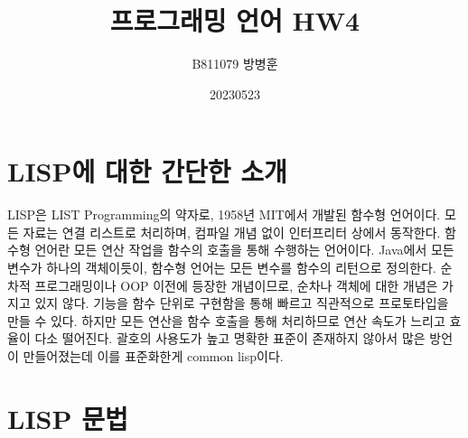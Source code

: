 \documentclass{article}
\title{프로그래밍 언어 HW4}
\author{B811079 방병훈}
\date{20230523}
\begin{document}
\maketitle
\section{LISP에 대한 간단한 소개}
LISP은 LIST Programming의 약자로, 1958년 MIT에서 개발된 함수형 언어이다. 모든 자료는 연결 리스트로 처리하며, 컴파일 개념 없이 인터프리터 상에서 동작한다. 함수형 언어란 모든 연산 작업을 함수의 호출을 통해 수행하는 언어이다. Java에서 모든 변수가 하나의 객체이듯이, 함수형 언어는 모든 변수를 함수의 리턴으로 정의한다. 순차적 프로그래밍이나 OOP 이전에 등장한 개념이므로, 순차나 객체에 대한 개념은 가지고 있지 않다. 기능을 함수 단위로 구현함을 통해 빠르고 직관적으로 프로토타입을 만들 수 있다. 하지만 모든 연산을 함수 호출을 통해 처리하므로 연산 속도가 느리고 효율이 다소 떨어진다. 괄호의 사용도가 높고 명확한 표준이 존재하지 않아서 많은 방언이 만들어졌는데 이를 표준화한게 common lisp이다. 
\section{LISP 문법}
\end{document}
